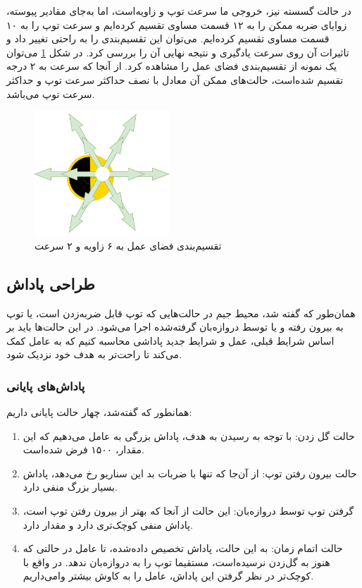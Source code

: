 در حالت گسسته نیز، خروجی ما سرعت توپ و زاویه‌است، اما به‌جای مقادیر پیوسته، زوایای ضربه ممکن را به ۱۲ قسمت مساوی تقسیم کرده‌ایم و سرعت توپ را به ۱۰ قسمت مساوی تقسیم کرده‌ایم.
می‌توان این تقسیم‌بندی را به راحتی تغییر داد و تاثیرات آن روی سرعت یادگیری و نتیجه نهایی آن را بررسی کرد.
در شکل \ref{fig:discretization} می‌توان یک نمونه از تقسیم‌بندی فضای عمل را مشاهده کرد.
از آنجا که سرعت به ۲ درجه تقسیم شده‌است، حالت‌های ممکن آن معادل با نصف حداکثر سرعت توپ و حداکثر سرعت توپ می‌باشد.
\begin{figure}[H]
    \centering
    \includegraphics[width=0.45\textwidth]{images/discretization.drawio.png}
    \caption{تقسیم‌بندی فضای عمل به ۶ زاویه و ۲ سرعت}\label{fig:discretization}
\end{figure}
\subsection{طراحی پاداش}
همان‌طور که گفته شد، محیط جیم در حالت‌هایی که توپ قابل ضربه‌زدن است، یا توپ به بیرون رفته و یا توسط دروازه‌بان گرفته‌شده اجرا می‌شود.
در این حالت‌ها باید بر اساس شرایط قبلی، عمل و شرایط جدید پاداشی محاسبه کنیم که به عامل کمک می‌کند تا راحت‌تر به هدف خود نزدیک شود.
\subsubsection{پاداش‌های پایانی}
همانطور که گفته‌شد، چهار حالت پایانی داریم:
\begin{enumerate}
    \item حالت گل زدن: با توجه به رسیدن به هدف، پاداش بزرگی به عامل می‌دهیم که این مقدار، ۱۵۰۰ فرض شده‌است.
    \item حالت بیرون رفتن توپ: از آن‌جا که تنها با ضربات بد این سناریو رخ می‌دهد، پاداش بسیار بزرگ منفی  دارد.
    \item گرفتن توپ توسط دروازه‌بان: این حالت از آنجا که بهتر از بیرون رفتن توپ است، پاداش منفی کوچک‌تری دارد و مقدار  دارد.
    \item حالت اتمام زمان: به این حالت، پاداش  تخصیص داده‌شده، تا عامل در حالتی که هنوز به گل‌زدن نرسیده‌است، مستقیما توپ را به دروازه‌بان ندهد. در واقع با کوچک‌تر در نظر گرفتن این پاداش، عامل را به کاوش بیشتر وا‌می‌داریم.
\end{enumerate}
